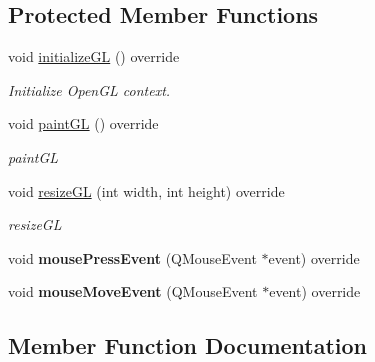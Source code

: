 \subsection*{Protected Member Functions}
\begin{DoxyCompactItemize}
\item 
\mbox{\label{class_g_l_widget_a2349a3ff7c9cc814de1b4a93a0b28acd}} 
void \mbox{\hyperlink{class_g_l_widget_a2349a3ff7c9cc814de1b4a93a0b28acd}{initialize\+GL}} () override
\begin{DoxyCompactList}\small\item\em Initialize Open\+GL context. \end{DoxyCompactList}\item 
\mbox{\label{class_g_l_widget_a843150d06edc5e2e50d98e395c2b8759}} 
void \mbox{\hyperlink{class_g_l_widget_a843150d06edc5e2e50d98e395c2b8759}{paint\+GL}} () override
\begin{DoxyCompactList}\small\item\em paint\+GL \end{DoxyCompactList}\item 
void \mbox{\hyperlink{class_g_l_widget_a71942bbb513fac0a1d4f0c1c24b37def}{resize\+GL}} (int width, int height) override
\begin{DoxyCompactList}\small\item\em resize\+GL \end{DoxyCompactList}\item 
\mbox{\label{class_g_l_widget_afeba4699aa12cde94ecd469e58a60aab}} 
void {\bfseries mouse\+Press\+Event} (Q\+Mouse\+Event $\ast$event) override
\item 
\mbox{\label{class_g_l_widget_a7cb45e554d24c2020512aa18949a6230}} 
void {\bfseries mouse\+Move\+Event} (Q\+Mouse\+Event $\ast$event) override
\end{DoxyCompactItemize}


\subsection{Member Function Documentation}
\mbox{\label{class_g_l_widget_a1e50c746ef5d95c14de5907be6239dd1}} 
